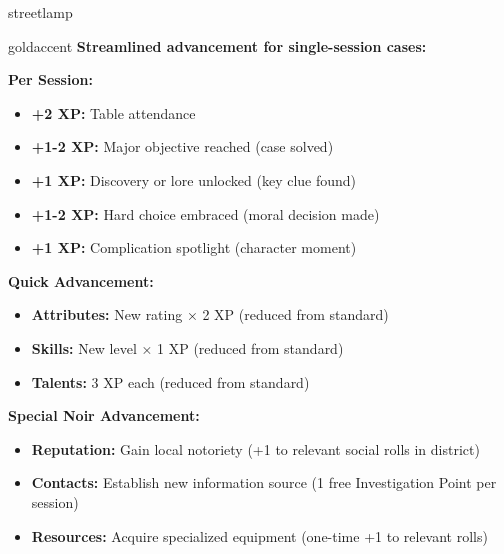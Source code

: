 \documentclass[11pt]{article}
\begin{document}
\begin{noirsection}{streetlamp}
\begin{mechanicbox}{goldaccent}
\textbf{Streamlined advancement for single-session cases:}

\textbf{Per Session:}
\begin{itemize}
    \item \textbf{+2 XP:} Table attendance
    \item \textbf{+1-2 XP:} Major objective reached (case solved)
    \item \textbf{+1 XP:} Discovery or lore unlocked (key clue found)
    \item \textbf{+1-2 XP:} Hard choice embraced (moral decision made)
    \item \textbf{+1 XP:} Complication spotlight (character moment)
\end{itemize}

\textbf{Quick Advancement:}
\begin{itemize}
    \item \textbf{Attributes:} New rating × 2 XP (reduced from standard)
    \item \textbf{Skills:} New level × 1 XP (reduced from standard)
    \item \textbf{Talents:} 3 XP each (reduced from standard)
\end{itemize}

\textbf{Special Noir Advancement:}
\begin{itemize}
    \item \textbf{Reputation:} Gain local notoriety (+1 to relevant social rolls in district)
    \item \textbf{Contacts:} Establish new information source (1 free Investigation Point per session)
    \item \textbf{Resources:} Acquire specialized equipment (one-time +1 to relevant rolls)
\end{itemize}
\end{mechanicbox}
\end{noirsection}
\end{document}
